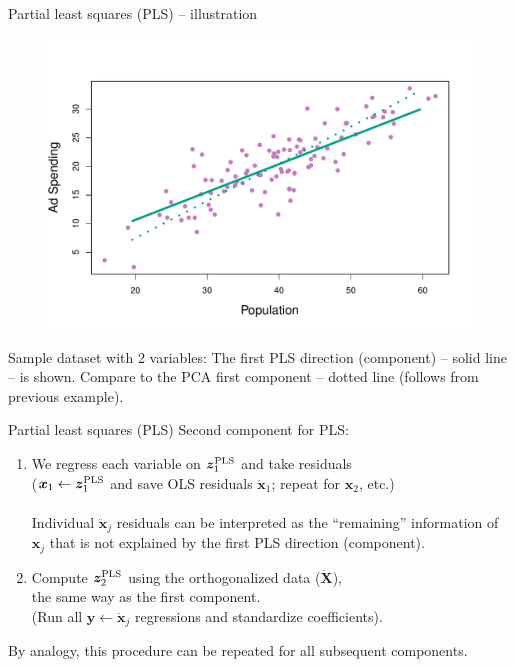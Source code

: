 \documentclass{beamer}
\begin{document}
\begin{frame}{Partial least squares (PLS) -- illustration}
\vspace{-1.2cm}
\begin{figure}
\includegraphics[scale=0.50]{IMG/PCAExample5.pdf}
\end{figure}
\vspace{-0.6cm}
\centering Sample dataset with 2 variables: The first PLS direction (component) -- solid line -- is shown. Compare to the PCA first component -- dotted line (follows from previous example).
\end{frame}
\begin{frame}{Partial least squares (PLS)}
Second component for PLS:\\
\medskip
\begin{enumerate}
    \item We regress each variable on $\bm{z}_1^{\textnormal{PLS}}$ and take residuals \\($\bm{x}_1 \leftarrow \bm{z}_1^{\textnormal{PLS}}$ and save OLS residuals $\ddot{\bm{x}}_1$; repeat for $\bm{x}_2$, etc.)\\~\\
    Individual $\ddot{\bm{x}}_j$ residuals can be interpreted as the ``remaining'' information of $\bm{x}_j$ that is not explained by the first PLS direction (component).\\
    \medskip
    \item Compute $\bm{z}_2^{\textnormal{PLS}}$ using the orthogonalized data ($\ddot{\bm{X}}$), \\the same way as the first component.\\
    (Run all $\bm{y} \leftarrow \ddot{\bm{x}}_j$ regressions and standardize coefficients).
\end{enumerate}
\bigskip
By analogy, this procedure can be repeated for all subsequent components.
\end{frame}
\end{document}
